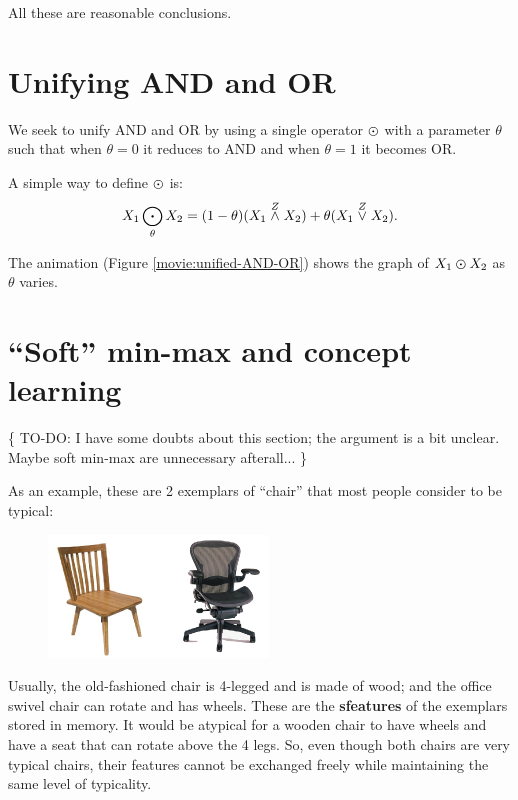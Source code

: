 All these are reasonable conclusions.

\section{Unifying AND and OR}
\label{sec:unifying-AND-and-OR}

We seek to unify AND and OR by using a single operator $\varodot$ with a parameter $\theta$ such that when $\theta = 0$ it reduces to AND and when $\theta = 1$ it becomes OR.

A simple way to define $\varodot$ is:
\begin{equation}
X_1 \bigodot_\theta X_2 = (1-\theta) (X_1 \stackrel{Z}{\wedge} X_2) + \theta (X_1 \stackrel{Z}{\vee} X_2).
\end{equation}

The animation (Figure \ref{movie:unified-AND-OR}) shows the graph of $X_1 \varodot X_2$ as $\theta$ varies.


\section{``Soft'' min-max and concept learning}

\{ TO-DO:  I have some doubts about this section; the argument is a bit unclear.  Maybe soft min-max are unnecessary afterall... \}

As an example, these are 2 exemplars of ``chair'' that most people consider to be typical:
\begin{figure}[H]
\centering
\includegraphics{2-chairs.png}
\end{figure}
Usually, the old-fashioned chair is 4-legged and is made of wood; and the office swivel chair can rotate and has wheels.  These are the \textbf{sfeatures} of the exemplars stored in memory.  It would be atypical for a wooden chair to have wheels and have a seat that can rotate above the 4 legs.  So, even though both chairs are very typical chairs, their features cannot be exchanged freely while maintaining the same level of typicality.

